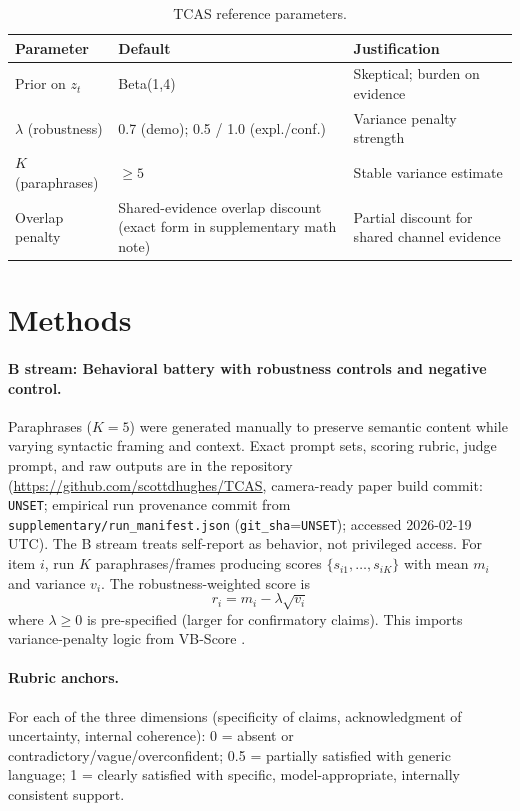 \documentclass[letterpaper]{article}
\newcommand{\CameraReadyCommit}{UNSET}
\newcommand{\EmpiricalRunCommit}{UNSET}
\begin{document}
\begin{table}[t]
\centering
\footnotesize
\caption{TCAS reference parameters.}
\label{tab:params}
\begin{tabular}{@{}p{0.70in}p{1.02in}p{0.88in}@{}}
\toprule
\textbf{Parameter} & \textbf{Default} & \textbf{Justification} \\
\midrule
Prior on $z_t$ & Beta(1,4) & Skeptical; burden on evidence \\
$\lambda$ (robustness) & 0.7 (demo); 0.5 / 1.0 (expl./conf.) & Variance penalty strength \\
$K$ (paraphrases) & $\geq 5$ & Stable variance estimate \\
Overlap penalty & Shared-evidence overlap discount (exact form in supplementary math note) & Partial discount for shared channel evidence \\
\bottomrule
\end{tabular}
\end{table}

\section{Methods}

\paragraph{B stream: Behavioral battery with robustness controls and negative control.}
Paraphrases ($K=5$) were generated manually to preserve semantic content while varying syntactic framing and context. Exact prompt sets, scoring rubric, judge prompt, and raw outputs are in the repository (\url{https://github.com/scottdhughes/TCAS}, camera-ready paper build commit: \texttt{\CameraReadyCommit}; empirical run provenance commit from \texttt{supplementary/run\_manifest.json} (\texttt{git\_sha}=\texttt{\EmpiricalRunCommit}); accessed 2026-02-19 UTC). The B stream treats self-report as behavior, not privileged access. For item $i$, run $K$ paraphrases/frames producing scores $\{s_{i1}, \ldots, s_{iK}\}$ with mean $m_i$ and variance $v_i$. The robustness-weighted score is
\begin{equation}
    r_i = m_i - \lambda\sqrt{v_i}
\end{equation}
where $\lambda \geq 0$ is pre-specified (larger for confirmatory claims). This imports variance-penalty logic from VB-Score \citep{ding2025}.

\paragraph{Rubric anchors.}
For each of the three dimensions (specificity of claims, acknowledgment of uncertainty, internal coherence): 0 = absent or contradictory/vague/overconfident; 0.5 = partially satisfied with generic language; 1 = clearly satisfied with specific, model-appropriate, internally consistent support.
\end{document}
